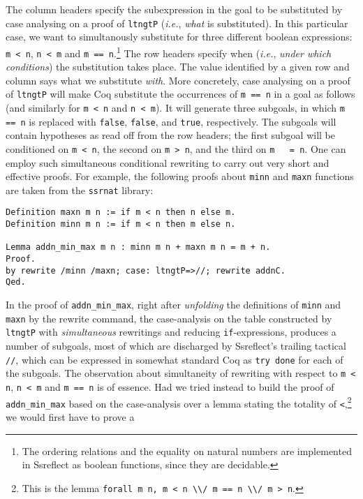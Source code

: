 \documentclass[blockstyle,preprint]{sigplanconf}
\newcommand{\code}[1]{\lstinline{#1}}
\newcommand{\ie}{\emph{i.e.}\xspace}
\begin{document}
\vspace{5pt}
\noindent
The column headers specify the subexpression in the goal to be
substituted by case analysing on a proof of \code{ltngtP} (\ie,
\emph{what} is substituted). In this particular case, we want to
simultanously substitute for three different boolean expressions:
\code{m < n}, \code{n < m} and \code{m == n}.\footnote{The ordering
  relations and the equality on natural numbers are implemented in
  Ssreflect as boolean functions, since they are decidable.}  The row
headers specify when (\ie, \emph{under which conditions}) the
substitution takes place. The value identified by a given row and
column says what we substitute \emph{with}.  More concretely, case
analysing on a proof of \code{ltngtP} will make Coq substitute the
occurrences of \code{m == n} in a goal as follows (and similarly for
\code{m < n} and \code{n < m}). It will generate three subgoals, in
which \code{m == n} is replaced with \code{false}, \code{false}, and
\code{true}, respectively. The subgoals will contain hypotheses as
read off from the row headers; the first subgoal will be conditioned
on \code{m < n}, the second on \code{m > n}, and the third on \code{m
  = n}. One can employ such simultaneous conditional rewriting to
carry out very short and effective proofs. For example, the following
proofs about \code{minn} and \code{maxn} functions are taken from the
\code{ssrnat} library:
%
\begin{lstlisting}
Definition maxn m n := if m < n then n else m.
Definition minn m n := if m < n then m else n.

Lemma addn_min_max m n : minn m n + maxn m n = m + n.
Proof.
by rewrite /minn /maxn; case: ltngtP=>//; rewrite addnC.
Qed.
\end{lstlisting}
%
In the proof of \code{addn_min_max}, right after \emph{unfolding} the
definitions of \code{minn} and \code{maxn} by the rewrite command, the
case-analysis on the table constructed by \code{ltngtP} with
\emph{simultaneous} rewritings and reducing \code{if}-expressions,
produces a number of subgoals, most of which are discharged by
Ssreflect's trailing tactical \code{//}, which can be expressed in
somewhat standard Coq as \code{try done} for each of the subgoals.
%
The observation about simultaneity of rewriting with respect to
\code{m < n}, \code{n < m} and \code{m == n} is of essence. Had we
tried instead to build the proof of \code{addn_min_max} based on the
case-analysis over a lemma stating the totality of
\code{<},\footnote{This is the lemma \code{forall m n, m < n \\/ m == n \\/ m > n}.} we would first have to prove a
\end{document}
